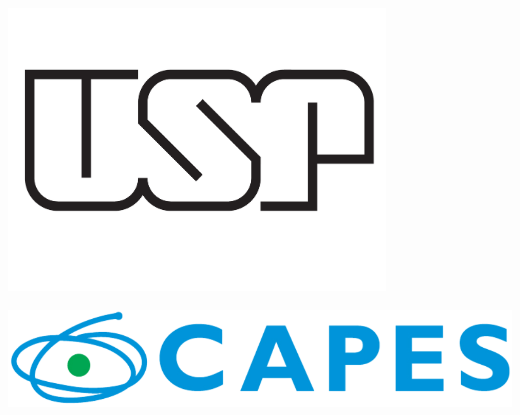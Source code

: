 \documentclass[a0,portrait]{a0poster}
\begin{document}
\columnseprule=0pt

\begin{multicols}{2}
\begin{minipage}[b]{0.3\linewidth}
\includegraphics[width=10cm]{usplogo.pdf}\\
\end{minipage}


%
\hfill
\begin{minipage}[b]{0.6\linewidth}
    \vspace{1.7cm}
\includegraphics[width=20cm]{logohorizontalcapes2.png}\\
\end{minipage}

\end{multicols}
\end{document}
